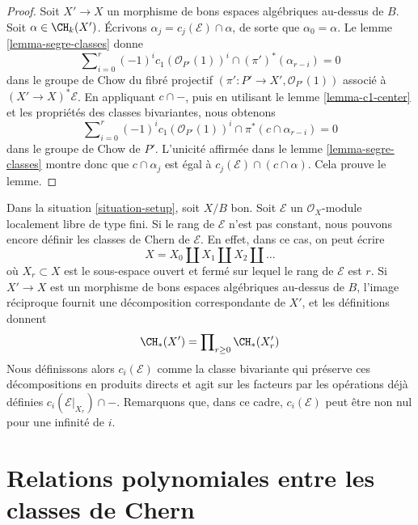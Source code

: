 \begin{proof}
Soit $X' \to X$ un morphisme de bons espaces algébriques au-dessus de $B$.
Soit $\alpha \in \CH_k(X')$. Écrivons $\alpha_j = c_j(\mathcal{E}) \cap
\alpha$, de sorte que $\alpha_0 = \alpha$. Le lemme
\ref{lemma-segre-classes} donne
$$
\sum\nolimits_{i = 0}^r
(-1)^i c_1(\mathcal{O}_{P'}(1))^i \cap
(\pi')^*(\alpha_{r - i}) = 0
$$
dans le groupe de Chow du fibré projectif $(\pi' : P' \to X',
\mathcal{O}_{P'}(1))$ associé à $(X' \to X)^*\mathcal{E}$. En appliquant $c
\cap -$, puis en utilisant le lemme \ref{lemma-c1-center} et les propriétés des
classes bivariantes, nous obtenons
$$
\sum\nolimits_{i = 0}^r
(-1)^i c_1(\mathcal{O}_{P'}(1))^i \cap
\pi^*(c \cap \alpha_{r - i}) = 0
$$
dans le groupe de Chow de $P'$. L'unicité affirmée dans le lemme
\ref{lemma-segre-classes} montre donc que $c \cap \alpha_j$ est égal à
$c_j(\mathcal{E}) \cap (c \cap \alpha)$. Cela prouve le lemme.
\end{proof}

\begin{remark}
\label{remark-extend-to-finite-locally-free}
Dans la situation \ref{situation-setup}, soit $X/B$ bon. Soit $\mathcal{E}$ un
$\mathcal{O}_X$-module localement libre de type fini. Si le rang de
$\mathcal{E}$ n'est pas constant, nous pouvons encore définir les classes de
Chern de $\mathcal{E}$. En effet, dans ce cas, on peut écrire
$$
X = X_0 \amalg X_1 \amalg X_2 \amalg \ldots
$$
où $X_r \subset X$ est le sous-espace ouvert et fermé sur lequel le rang de
$\mathcal{E}$ est $r$. Si $X' \to X$ est un morphisme de bons espaces
algébriques au-dessus de $B$, l'image réciproque fournit une décomposition
correspondante de $X'$, et les définitions donnent
$$
\CH_*(X') = \prod\nolimits_{r \geq 0} \CH_*(X'_r)
$$
Nous définissons alors $c_i(\mathcal{E})$ comme la classe bivariante qui
préserve ces décompositions en produits directs et agit sur les facteurs par
les opérations déjà définies $c_i(\mathcal{E}|_{X_r}) \cap -$. Remarquons que,
dans ce cadre, $c_i(\mathcal{E})$ peut être non nul pour une infinité de $i$.
\end{remark}












\section{Relations polynomiales entre les classes de Chern}
\label{section-relations-chern-classes}

